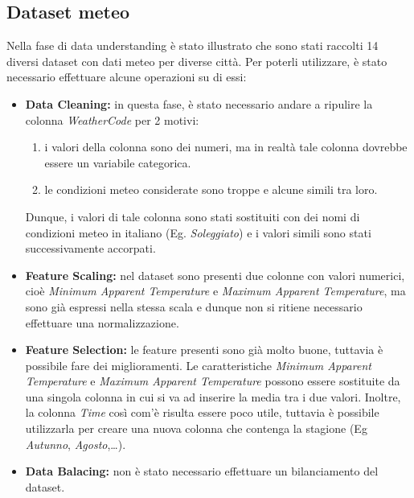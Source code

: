 \documentclass[a4paper, 11pt, oneside]{report}
\begin{document}
                \subsection{Dataset meteo}
                Nella fase di data understanding è stato illustrato che sono stati raccolti 14 diversi dataset con dati meteo per diverse città.
                Per poterli utilizzare, è stato necessario effettuare alcune operazioni su di essi:\\
                \begin{itemize}
                    \item \textbf{Data Cleaning:} in questa fase, è stato necessario andare a ripulire la colonna \emph{WeatherCode} per 2 motivi:
                        \begin{enumerate}
                            \item i valori della colonna sono dei numeri, ma in realtà tale colonna dovrebbe essere un variabile categorica.
                            \item le condizioni meteo considerate sono troppe e alcune simili tra loro.
                        \end{enumerate}
                    Dunque, i valori di tale colonna sono stati sostituiti con dei nomi di condizioni meteo in italiano (Eg.
                    \emph{Soleggiato}) e i valori simili sono stati successivamente accorpati.
                    \item \textbf{Feature Scaling:} nel dataset sono presenti due colonne con valori numerici, cioè
                    \emph{Minimum Apparent Temperature} e \emph{Maximum Apparent Temperature},
                    ma sono già espressi nella stessa scala e dunque non si ritiene necessario effettuare una normalizzazione.
                    \item \textbf{Feature Selection:} le feature presenti sono già molto buone, tuttavia è possibile fare dei miglioramenti.
                    Le caratteristiche \emph{Minimum Apparent Temperature} e \emph{Maximum Apparent Temperature}
                    possono essere sostituite da una singola colonna in cui si va ad inserire la media tra i due valori.
                    Inoltre, la colonna \emph{Time} così com'è risulta essere poco utile, tuttavia è possibile utilizzarla per
                    creare una nuova colonna che contenga la stagione (Eg \emph{Autunno}, \emph{Agosto},\ldots).
                    \item \textbf{Data Balacing:} non è stato necessario effettuare un bilanciamento del dataset.
                \end{itemize}
\end{document}
